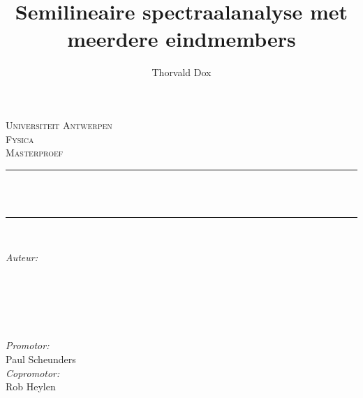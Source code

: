 \documentclass[12pt]{report}
\date{}
\title{Semilineaire spectraalanalyse met meerdere eindmembers}
\author{Thorvald Dox}
\begin{document}
\begin{titlepage}

\newcommand{\HRule}{\rule{\linewidth}{0.5mm}} %

\center %
 

\textsc{\LARGE Universiteit Antwerpen}\\[1.5cm] %
\textsc{\Large Fysica}\\[0.5cm] %
\textsc{\large Masterproef}\\[0.5cm] %


\HRule \\[0.4cm]
{ \Large \bfseries \thetitle}\\[0.4cm] %
\HRule \\[1.5cm]
 

\begin{minipage}{0.4\textwidth}
\begin{flushleft} \large
\emph{Auteur:}\\
\theauthor %
~\\
~\\
~\\
\end{flushleft}
\end{minipage}
~
\begin{minipage}{0.4\textwidth}
\begin{flushright} \large
\emph{Promotor:} \\
Paul {Scheunders} \\ %
\emph{Copromotor:} \\
Rob {Heylen} %
\end{flushright}
\end{minipage}\\[5cm]


\end{titlepage}
\end{document}
